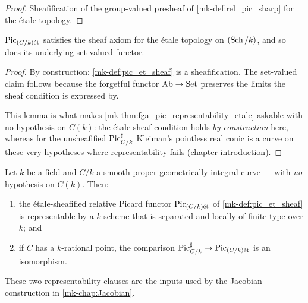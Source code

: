 \begin{proof}
  \leanok{}
  Sheafification of the group-valued presheaf of \ref{mk-def:rel_pic_sharp} for
  the \'etale topology.
\end{proof}

\begin{lemma}\label{mk-lem:pic_et_is_sheaf}
  \leanok

  \(\operatorname{Pic}_{(C/k)\mathrm{\acute{e}t}}\) satisfies the sheaf axiom for the \'etale topology on
  \((\operatorname{Sch}/k)\), and so does its underlying set-valued functor.
\end{lemma}

\begin{proof}
  \leanok{}
  By construction: \ref{mk-def:pic_et_sheaf} is a sheafification. The set-valued
  claim follows because the forgetful functor \(\mathrm{Ab} \to \mathrm{Set}\) preserves the
  limits the sheaf condition is expressed by.

  This lemma is what makes \ref{mk-thm:fga_pic_representability_etale} askable with
  no hypothesis on \(C(k)\): the \'etale sheaf condition holds \emph{by
  construction} here, whereas for the unsheafified \(\operatorname{Pic}^\sharp_{C/k}\) Kleiman's
  pointless real conic is a curve on these very hypotheses where representability
  fails (chapter introduction).
\end{proof}

\begin{theorem}
  \label{mk-thm:fga_pic_representability_etale}

  Let \(k\) be a field and \(C/k\) a smooth proper geometrically integral
  curve --- with \emph{no} hypothesis on \(C(k)\). Then:
  \begin{enumerate}
    \item the \'etale-sheafified relative Picard functor \(\operatorname{Pic}_{(C/k)\mathrm{\acute{e}t}}\) of
      \ref{mk-def:pic_et_sheaf} is representable by a \(k\)-scheme that is
      separated and locally of finite type over \(k\); and
    \item if \(C\) has a \(k\)-rational point, the comparison
      \(\operatorname{Pic}^\sharp_{C/k} \to \operatorname{Pic}_{(C/k)\mathrm{\acute{e}t}}\) is an isomorphism.
  \end{enumerate}

  These two representability clauses are the inputs used by the Jacobian
  construction in \ref{mk-chap:Jacobian}.
\end{theorem}

